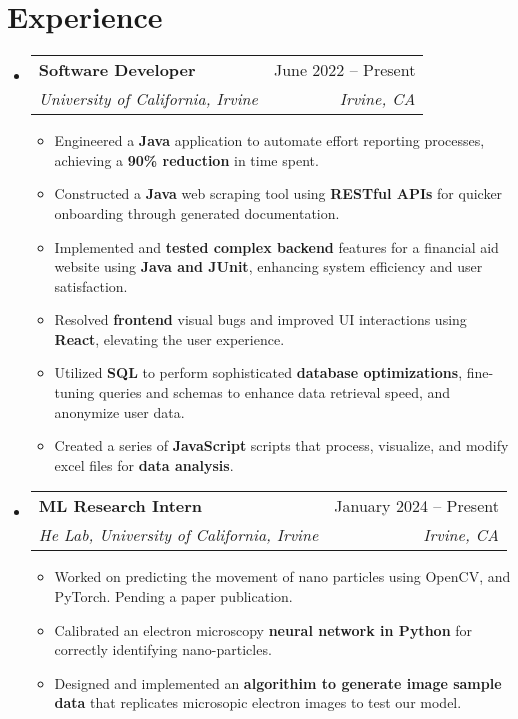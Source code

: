 \documentclass[letterpaper,11pt]{article}
\makeatletter
\newcommand{\resumeItem}[1]{
  \item\small{
    {#1 \vspace{-2pt}}
  }
}
\newcommand{\resumeSubheading}[4]{
  \vspace{-2pt}\item
    \begin{tabular*}{0.97\textwidth}[t]{l@{\extracolsep{\fill}}r}
      \textbf{#1} & #2 \\
      \textit{\small#3} & \textit{\small #4} \\
    \end{tabular*}\vspace{-7pt}
}
\newcommand{\resumeSubSubheading}[2]{
    \item
    \begin{tabular*}{0.97\textwidth}{l@{\extracolsep{\fill}}r}
      \textit{\small#1} & \textit{\small #2} \\
    \end{tabular*}\vspace{-7pt}
}
\newcommand{\resumeSubHeadingListStart}{\begin{itemize}[leftmargin=0.15in, label={}]}
\newcommand{\resumeSubHeadingListEnd}{\end{itemize}}
\newcommand{\resumeItemListStart}{\begin{itemize}}
\newcommand{\resumeItemListEnd}{\end{itemize}\vspace{-5pt}}
\makeatother
\begin{document}
\section{Experience}
  \resumeSubHeadingListStart

    \resumeSubheading
      {Software Developer}{June 2022 -- Present}
      {University of California, Irvine}{Irvine, CA}
      \resumeItemListStart
        \resumeItem{Engineered a \textbf{Java} application to automate effort reporting processes, achieving a \textbf{90\% reduction} in time spent.}
        \resumeItem{Constructed a \textbf{Java} web scraping tool using \textbf{RESTful APIs} for quicker onboarding through generated documentation.
        }
        \resumeItem{Implemented and \textbf{tested complex backend} features for a financial aid website using \textbf{Java and JUnit}, enhancing system efficiency and user satisfaction.
        }
        \resumeItem{Resolved \textbf{frontend} visual bugs and improved UI interactions using \textbf{React}, elevating the user experience. 
        }
        \resumeItem{Utilized \textbf{SQL} to perform sophisticated \textbf{database optimizations}, fine-tuning queries and schemas to enhance data retrieval speed, and anonymize user data.
        }
        \resumeItem{Created a series of \textbf{JavaScript} scripts that process, visualize, and modify excel files for \textbf{data analysis}.}
      \resumeItemListEnd
    \resumeSubheading
      {ML Research Intern}{January 2024 -- Present}
      {He Lab, University of California, Irvine}{Irvine, CA}
      \resumeItemListStart
        \resumeItem{Worked on predicting the movement of nano particles using OpenCV, and PyTorch. Pending a paper publication.}
        \resumeItem{Calibrated an electron microscopy \textbf{neural network in Python} for correctly identifying nano-particles.
        }
        \resumeItem{Designed and implemented an \textbf{algorithim to generate image sample data} that replicates microsopic electron images to test our model. 
        }
      \resumeItemListEnd
      

  \resumeSubHeadingListEnd
\end{document}
